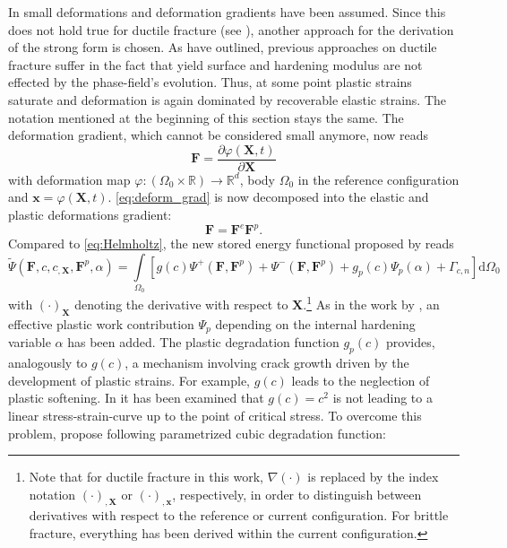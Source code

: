 In  small deformations and deformation gradients have been assumed. Since this does not hold true for ductile fracture (see ), another approach for the derivation of the strong form is chosen. As \citet{03_PF_ductile} have outlined, previous approaches on ductile fracture suffer in the fact that yield surface and hardening modulus are not effected by the phase-field's evolution. Thus, at some point plastic strains saturate and deformation is again dominated by recoverable elastic strains. The notation mentioned at the beginning of this section stays the same. The deformation gradient, which cannot be considered small anymore, now reads
\begin{equation} \label{eq:deform_grad}
	\mathbf{F}=\dfrac{\partial\varphi\left(\mathbf{X},t\right)}{\partial\mathbf{X}}
\end{equation}
with deformation map $\varphi:\left(\Omega_{0}\times\mathbb{R}\right)\rightarrow\mathbb{R}^{d}$, body $\Omega_{0}$ in the reference configuration  and $\mathbf{x}=\varphi\left(\mathbf{X},t\right)$. \eqref{eq:deform_grad} is now decomposed into the elastic and plastic deformations gradient:
\begin{equation} \label{eq:deform_grad_decomp}
	\mathbf{F}=\mathbf{F}^{e}\mathbf{F}^{p}.
\end{equation}
Compared to \eqref{eq:Helmholtz}, the new stored energy functional proposed by \citet{03_PF_ductile} reads
\begin{equation} \label{eq:fctal_ductile}
	\tilde{\Psi}\left(\mathbf{F},c,c_{,\mathbf{X}},\mathbf{F}^{p},\alpha\right) = \int\limits_{\Omega_{0}}\left[g\left(c\right)\Psi^{+}\left(\mathbf{F},\mathbf{F}^{p}\right)+\Psi^{-}\left(\mathbf{F},\mathbf{F}^{p}\right)+g_{p}\left(c\right)\Psi_{p}\left(\alpha\right)+\Gamma_{c,n}\right]\mathrm{d}\Omega_{0}
\end{equation}
with $\left(\cdot\right)_{\mathbf{X}}$ denoting the derivative with respect to $\mathbf{X}$.\footnote{Note that for ductile fracture in this work, $\nabla\left(\cdot\right)$ is replaced by the index notation $\left(\cdot\right)_{,\mathbf{X}}$ or $\left(\cdot\right)_{,\mathbf{x}}$, respectively, in order to distinguish between derivatives with respect to the reference or current configuration. For brittle fracture, everything has been derived within the current configuration.} As in the work by \citet{06_PF_ductile}, an effective plastic work contribution $\Psi_{p}$ depending on the internal hardening variable $\alpha$ has been added. The plastic degradation function $g_{p}\left(c\right)$ provides, analogously to $g\left(c\right)$, a mechanism involving crack growth driven by the development of plastic strains. For example, $g\left(c\right)$ leads to the neglection of plastic softening. In \citep{03_PF_ductile} it has been examined that $g\left(c\right)=c^{2}$ is not leading to a linear stress-strain-curve up to the point of critical stress. To overcome this problem, \citet{03_PF_ductile} propose following parametrized cubic degradation function:
